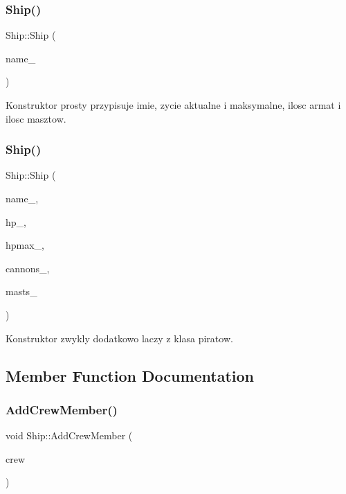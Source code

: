 \subsubsection{\texorpdfstring{Ship()}{Ship()}\hspace{0.1cm}{\footnotesize\ttfamily [1/2]}}
{\footnotesize\ttfamily Ship\+::\+Ship (\begin{DoxyParamCaption}\item[{string}]{name\+\_\+ }\end{DoxyParamCaption})\hspace{0.3cm}{\ttfamily [inline]}}



Konstruktor prosty przypisuje imie, zycie aktualne i maksymalne, ilosc armat i ilosc masztow. 

\mbox{\label{class_ship_abb6276e9a6bfab2e74a2a74eda0fa705}} 
\subsubsection{\texorpdfstring{Ship()}{Ship()}\hspace{0.1cm}{\footnotesize\ttfamily [2/2]}}
{\footnotesize\ttfamily Ship\+::\+Ship (\begin{DoxyParamCaption}\item[{string}]{name\+\_\+,  }\item[{int}]{hp\+\_\+,  }\item[{int}]{hpmax\+\_\+,  }\item[{int}]{cannons\+\_\+,  }\item[{int}]{masts\+\_\+ }\end{DoxyParamCaption})\hspace{0.3cm}{\ttfamily [inline]}}



Konstruktor zwykly dodatkowo laczy z klasa piratow. 



\subsection{Member Function Documentation}
\mbox{\label{class_ship_a8e6cb2f38ab78b23ad63c8805829fe4a}} 
\subsubsection{\texorpdfstring{Add\+Crew\+Member()}{AddCrewMember()}}
{\footnotesize\ttfamily void Ship\+::\+Add\+Crew\+Member (\begin{DoxyParamCaption}\item[{\hyperlink{class_crew_member}{Crew\+Member}}]{crew }\end{DoxyParamCaption})}



